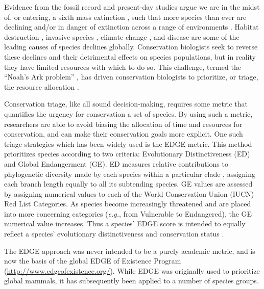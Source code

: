\documentclass[12pt,english]{article}
\begin{document}
Evidence from the fossil record and present-day studies argue we are in the
midst of, or entering, a sixth mass extinction \autocite{Barnosky2011,
Ceballos2015}, such that more species than ever are declining and/or in danger
of extinction across a range of environments \autocite{Wake2008,Thomas2004}.
Habitat destruction \autocite{Brooks2002}, invasive species
\autocite{Molnar2008}, climate change \autocite{Pounds2006}, and disease 
\autocite{Lips2006} are some of the leading causes of species declines globally.
Conservation biologists seek to reverse these declines and their detrimental
effects on species populations, but in reality they have limited resources with
which to do so. This challenge, termed the ``Noah's Ark problem''
\autocite{Weitzman1998}, has driven conservation biologists to prioritize, or
triage, the resource allocation \autocite{Bottrill2008}.

Conservation triage, like all sound decision-making, requires some metric that
quantifies the urgency for conservation a set of species. By using such a
metric, researchers are able to avoid biasing the allocation of time and
resources for conservation, and can make their conservation goals more explicit.
One such triage strategies which has been widely used is the EDGE
metric\autocite[Evolutionary Distinction and Globally Endangered;][]{Isaac2007}.
This method prioritizes species according to two criteria: Evolutionary
Distinctiveness (ED) and Global Endangerment (GE). ED measures relative
contributions to phylogenetic diversity made by each species within a particular
clade \autocite{Isaac2007}, assigning each branch length equally to all its
subtending species. GE values are assessed by assigning numerical values to each
of the World Conservation Union (IUCN) Red List Categories. As species become
increasingly threatened and are placed into more concerning categories
(\emph{e.g.}, from Vulnerable to Endangered), the GE numerical value increases.
Thus a species' EDGE score is intended to equally reflect a species'
evolutionary distinctiveness and conservation status \autocite{Pearse2015}.

The EDGE approach was never intended to be a purely academic metric, and is now
the basis of the global EDGE of Existence Program
(\url{http://www.edgeofexistence.org/}). While EDGE was originally used to
prioritize global mammals, it has subsequently been applied to a number of
species groups.
\end{document}
